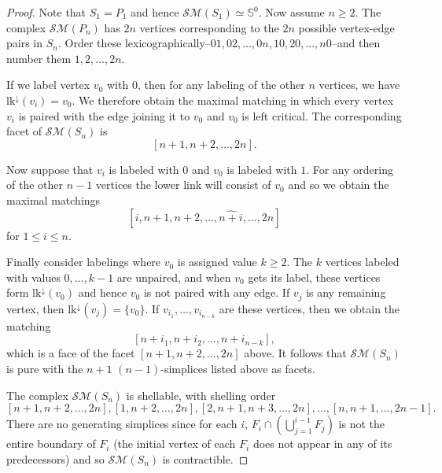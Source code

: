 \documentclass[10pt,a4paper]{amsart}
\newcommand{\sm}{{\mathcal{SM}}}
\newcommand{\zs}{{\mathbb S}}
\begin{document}
\begin{proof}
    Note that $S_1=P_1$ and hence $\sm(S_1)\simeq \zs^0$. Now assume $n\ge 2$. The complex $\sm(P_n)$ has $2n$ vertices corresponding to the $2n$ possible vertex-edge pairs in $S_n$. Order these lexicographically--$01,02,\dots ,0n,10,20,\dots ,n0$--and then number them $1,2,\dots ,2n$.  
    
    If we label vertex $v_0$ with $0$, then for any labeling of the other $n$ vertices, we have $\textrm{lk}^\downarrow(v_i) = v_0$. We therefore obtain the maximal matching in which every vertex $v_i$ is paired with the edge joining it to $v_0$ and $v_0$ is left critical. The corresponding facet of $\sm(S_n)$ is $$[n+1,n+2,\dots ,2n].$$ 

    Now suppose that $v_i$ is labeled with $0$ and $v_0$ is labeled with $1$. For any ordering of the other $n-1$ vertices the lower link will consist of $v_0$ and so we obtain the maximal matchings $$[i,n+1,n+2,\dots ,\widehat{n+i},\dots ,2n]$$ for $1\le i\le n$.
    
    Finally consider labelings where $v_0$ is assigned value $k\ge 2$. The $k$ vertices labeled with values $0,\dots ,k-1$ are unpaired, and when $v_0$ gets its label, these vertices form $\textrm{lk}^\downarrow(v_0)$ and hence $v_0$ is not paired with any edge. If $v_j$ is any remaining vertex, then $\textrm{lk}^\downarrow(v_j) = \{v_0\}$. If $v_{i_1},\dots ,v_{i_{n-k}}$ are these vertices, then we obtain the matching $$[n+i_1,n+i_2,\dots ,n+{i_{n-k}}],$$ which is a face of the facet $[n+1,n+2,\dots ,2n]$ above. It follows that $\sm(S_n)$ is pure with the $n+1$ $(n-1)$-simplices listed above as facets.

    The complex $\sm(S_n)$ is shellable, with shelling order $$[n+1,n+2,\dots ,2n],[1,n+2,\dots ,2n],[2,n+1,n+3,\dots,2n],\dots ,[n,n+1,\dots ,2n-1].$$ There are no generating simplices since for each $i$, $F_i\cap (\bigcup_{j=1}^{i-1}F_j)$ is not the entire boundary of $F_i$ (the initial vertex of each $F_i$ does not appear in any of its predecessors) and so $\sm(S_n)$ is contractible.
\end{proof}
\end{document}
